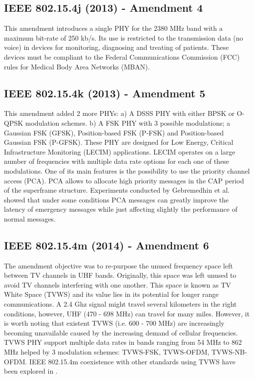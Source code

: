 \documentclass[conference]{IEEEtran}
\begin{document}
\subsection{IEEE 802.15.4j (2013) - Amendment 4 }\label{wpan2014j}
This amendment \cite{std2013j} introduces a single PHY for the 2380 MHz band with a maximum bit-rate of 250 kb/s. Its use is restricted to the transmission data (no voice) in devices for monitoring, diagnosing and treating of patients. These devices must be compliant to the Federal Communications Commission (FCC) rules for Medical Body Area Networks (MBAN).
\subsection{IEEE 802.15.4k (2013) - Amendment 5 }\label{wpan2014k}
This amendment added 2 more PHYs: a) A DSSS PHY with either BPSK or O-QPSK modulation schemes. b) A FSK PHY with 3 possible modulations; a Gaussian FSK (GFSK), Position-based FSK (P-FSK) and Position-based Gaussian FSK (P-GFSK). These PHY are designed for Low Energy, Critical Infrastructure Monitoring (LECIM) applications. LECIM operates on a large number of frequencies \cite[pp. 58-61]{std2013k} with multiple data rate options for each one of these modulations. One of its main features is the possibility to use the priority channel access (PCA). PCA allows to allocate high priority messages in the CAP period of the superframe structure. Experiments conducted by Gebremedhin et al.\cite{experimentK} showed that under some conditions PCA messages can greatly improve the latency of emergency messages while just affecting slightly the performance of normal messages.
\subsection{IEEE 802.15.4m (2014) - Amendment 6 }\label{wpan2014m}
The amendment objective was to re-purpose the unused frequency space left between TV channels in UHF bands. Originally, this space was left unused to avoid TV channels interfering with one another. This space is known as TV White Space (TVWS) and its value lies in its potential for longer range communications. A 2.4 Ghz signal might travel several kilometers in the right conditions, however, UHF (470 - 698 MHz) can travel for many miles. However, it is worth noting that existent TVWS (i.e. 600 - 700 MHz) are increasingly becoming unavailable caused by the increasing demand of cellular frequencies. TVWS PHY support multiple data rates in bands ranging from 54 MHz to 862 MHz helped by 3 modulation schemes: TVWS-FSK, TVWS-OFDM, TVWS-NB-OFDM. IEEE 802.15.4m coexistence with other standards using TVWS have been explored in \cite{coexistance}.
\end{document}
